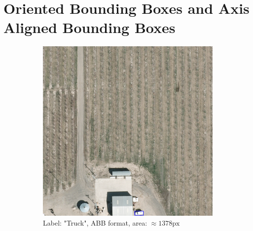 \section{Oriented Bounding Boxes and Axis Aligned Bounding Boxes}
\begin{figure}[h]
    \centering
    
    \begin{subfigure}[b]{0.45\textwidth}
        \centering
        \includegraphics[trim={550pt 0pt 410pt 990pt},clip,width=\textwidth]{images/015Results/01abb_vs_obb/abb_truck.png}
        \caption{Label: "Truck", ABB format, area: $\approx 1378 \text{px}$}
        \label{fig:abb_truck}
    \end{subfigure}
    \hfill
    \begin{subfigure}[b]{0.45\textwidth}
        \centering

\end{subfigure}
\end{figure}
